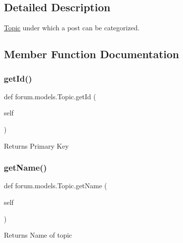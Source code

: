 \subsection{Detailed Description}
\mbox{\hyperlink{classforum_1_1models_1_1_topic}{Topic}} under which a post can be categorized. 

\subsection{Member Function Documentation}
\mbox{\label{classforum_1_1models_1_1_topic_ae321a4274c1abfc3d41f1611b877c361}} 
\subsubsection{\texorpdfstring{get\+Id()}{getId()}}
{\footnotesize\ttfamily def forum.\+models.\+Topic.\+get\+Id (\begin{DoxyParamCaption}\item[{}]{self }\end{DoxyParamCaption})}

\begin{DoxyReturn}{Returns}
Primary Key 
\end{DoxyReturn}
\mbox{\label{classforum_1_1models_1_1_topic_af6c46b55d4c745aa779ac1bd95f430d3}} 
\subsubsection{\texorpdfstring{get\+Name()}{getName()}}
{\footnotesize\ttfamily def forum.\+models.\+Topic.\+get\+Name (\begin{DoxyParamCaption}\item[{}]{self }\end{DoxyParamCaption})}

\begin{DoxyReturn}{Returns}
Name of topic 
\end{DoxyReturn}
\mbox{\label{classforum_1_1models_1_1_topic_ae3784c5c9abe0e44ca41f692328570c4}} 
